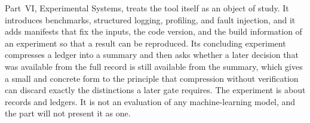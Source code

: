 Part~VI, Experimental Systems, treats the tool itself as an object of study. It introduces benchmarks, structured logging, profiling, and fault injection, and it adds manifests that fix the inputs, the code version, and the build information of an experiment so that a result can be reproduced. Its concluding experiment compresses a ledger into a summary and then asks whether a later decision that was available from the full record is still available from the summary, which gives a small and concrete form to the principle that compression without verification can discard exactly the distinctions a later gate requires. The experiment is about records and ledgers. It is not an evaluation of any machine-learning model, and the part will not present it as one.
